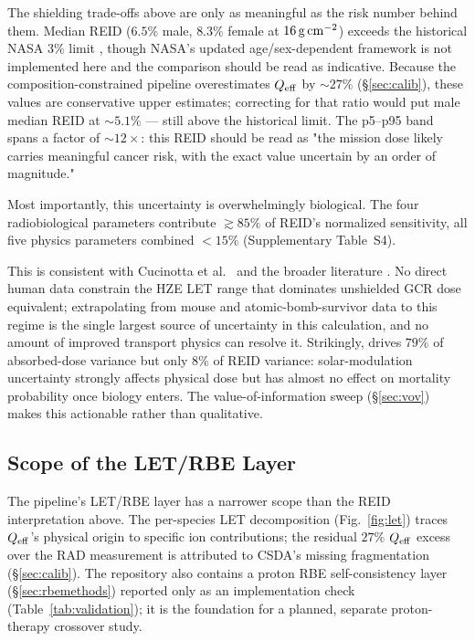 The shielding trade-offs above are only as meaningful as the risk number
behind them. Median REID ($6.5\%$ male, $8.3\%$ female at $16\,\mathrm{g\,cm^{-2}}$) exceeds the
historical NASA $3\%$ limit \citep{nasa2014}, though NASA's updated
age/sex-dependent framework \citep{nasa2023} is not implemented here and
the comparison should be read as indicative. Because the
composition-constrained pipeline overestimates $Q_\mathrm{eff}$ by $\sim\!27\%$
(\S\ref{sec:calib}), these values are conservative upper estimates;
correcting for that ratio would put male median REID at $\sim\!5.1\%$ —
still above the historical limit. The p5--p95 band spans a factor of
$\sim\!12\times$: this REID should be read as "the mission dose likely
carries meaningful cancer risk, with the exact value uncertain by an
order of magnitude."

Most importantly, this uncertainty is overwhelmingly biological. The four
radiobiological parameters contribute $\gtrsim\!85\%$ of REID's normalized
sensitivity, all five physics parameters combined $<15\%$ (Supplementary
Table~S4).

This is consistent with Cucinotta et al.\ \cite{cucinotta2013} and the
broader literature \citep{durante2011}. No direct human data constrain the
HZE LET range that dominates unshielded GCR dose equivalent; extrapolating
from mouse and atomic-bomb-survivor data to this regime is the single
largest source of uncertainty in this calculation, and no amount of
improved transport physics can resolve it. Strikingly, 
drives $79\%$ of absorbed-dose variance but only $8\%$ of REID variance:
solar-modulation uncertainty strongly affects physical dose but has almost
no effect on mortality probability once biology enters. The
value-of-information sweep (\S\ref{sec:vov}) makes this actionable rather
than qualitative.

\subsection{Scope of the LET/RBE Layer}

The pipeline's LET/RBE layer has a narrower scope than the REID
interpretation above. The
per-species LET decomposition (Fig.~\ref{fig:let}) traces $Q_\mathrm{eff}$'s
physical origin to specific ion contributions; the residual $27\%$
$Q_\mathrm{eff}$ excess over the RAD measurement is attributed to CSDA's missing
fragmentation (\S\ref{sec:calib}). The repository also contains a proton
RBE self-consistency layer (\S\ref{sec:rbemethods}) reported only as an
implementation check (Table~\ref{tab:validation}); it is the foundation
for a planned, separate proton-therapy crossover study.

